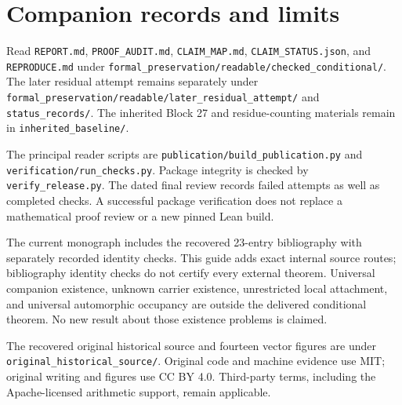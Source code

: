 \documentclass[11pt]{article}
\newcommand{\code}[1]{\nolinkurl{#1}}
\begin{document}
\clearpage
\section{Companion records and limits}
Read \code{REPORT.md}, \code{PROOF_AUDIT.md}, \code{CLAIM_MAP.md},
\code{CLAIM_STATUS.json}, and \code{REPRODUCE.md} under
\code{formal_preservation/readable/checked_conditional/}. The later residual
attempt remains separately under
\code{formal_preservation/readable/later_residual_attempt/} and
\code{status_records/}. The inherited Block 27 and residue-counting materials
remain in \code{inherited_baseline/}.

The principal reader scripts are \code{publication/build_publication.py} and
\code{verification/run_checks.py}. Package integrity is checked by
\code{verify_release.py}. The dated final review records failed attempts as well
as completed checks. A successful package verification does not replace a
mathematical proof review or a new pinned Lean build.

The current monograph includes the recovered 23-entry bibliography with
separately recorded identity checks. This guide adds exact internal source
routes; bibliography identity checks do not certify every external theorem. Universal companion existence, unknown carrier existence, unrestricted
local attachment, and universal automorphic occupancy are outside the delivered
conditional theorem. No new result about those existence problems is claimed.

The recovered original historical source and fourteen vector figures are under
\code{original_historical_source/}. Original code and machine evidence use MIT;
original writing and figures use CC BY 4.0. Third-party terms, including the
Apache-licensed arithmetic support, remain applicable.
\end{document}
